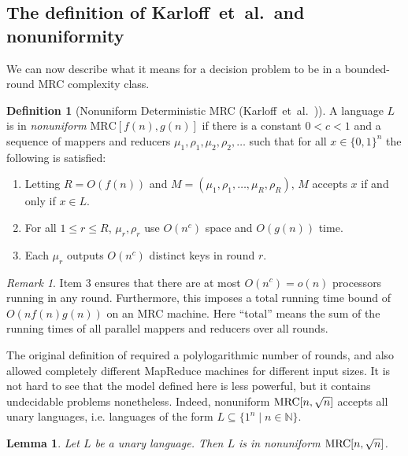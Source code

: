 \documentclass[11pt]{article}
\newtheorem{lemma}[theorem]{Lemma}
\theoremstyle{definition}
\newtheorem{defn}{Definition}
\theoremstyle{remark}
\newtheorem{remark}{Remark}
\newcommand{\N}{\mathbb{N}}
\newcommand{\mrc}{\textup{MRC}}
\begin{document}
\subsection{The definition of Karloff~et~al.~and nonuniformity}
\label{sec:nonuniform}

We can now describe what it means for a decision problem to be in a
bounded-round MRC complexity class.

\begin{defn}[Nonuniform Deterministic MRC (Karloff~et~al.~\cite{Karloff10})]
A language $L$ is in \emph{nonuniform} $\text{MRC}[f(n),g(n)]$ if there is a
constant $0 < c < 1$ and a sequence of mappers and reducers $\mu_1, \rho_1,
\mu_{2}, \rho_{2}, \ldots$ such that for all $x \in \{ 0,1 \}^n$ the following
is satisfied:
\begin{enumerate}
   \item Letting $R=O(f(n))$ and $M = (\mu_1, \rho_1, \dots, \mu_{R},
\rho_{R})$, $M$ accepts $x$ if and only if $x \in L$.
   \item For all $1 \leq r \leq R$, $\mu_r, \rho_r$ use $O(n^c)$ space and
$O(g(n))$ time.
   \item Each $\mu_r$ outputs $O(n^c)$ distinct keys in round $r$.
\end{enumerate}
\end{defn}

\begin{remark}
Item 3 ensures that there are at most $O(n^c) = o(n)$ processors running in any
round. Furthermore, this imposes a total running time bound of $O(nf(n)g(n))$
on an MRC machine. Here ``total'' means the sum of the running times of all
parallel mappers and reducers over all rounds.
\end{remark}

The original definition of \cite{Karloff10} required a polylogarithmic number
of rounds, and also allowed completely different MapReduce machines for
different input sizes. It is not hard to see that the model defined here is
less powerful, but it contains undecidable problems nonetheless. Indeed,
nonuniform $\mrc[n, \sqrt{n}]$ accepts all unary languages, i.e. languages of
the form $L \subseteq \{1^n \mid n \in \N\}$.

\begin{lemma}\label{lemma:unary}
Let $L$ be a unary language. Then $L$ is in nonuniform $\mrc[n, \sqrt{n}]$.
\end{lemma}
\end{document}
